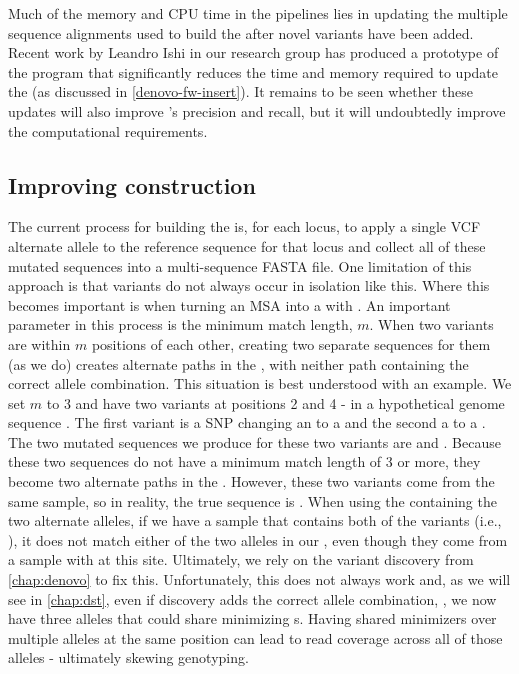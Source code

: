 Much of the memory and CPU time in the \pandora{} pipelines lies in updating the multiple sequence alignments used to build the \panrg{} after novel variants have been added. Recent work by Leandro Ishi in our research group has produced a prototype of the \makeprg{} program that significantly reduces the time and memory required to update the \panrg{} (as discussed in \autoref{denovo-fw-insert}). It remains to be seen whether these updates will also improve \pandora{}'s precision and recall, but it will undoubtedly improve the computational requirements. 

\subsection{Improving \panrg{} construction}
\label{sec:improve-prg}
The current process for building the \mtb{} \panrg{} is, for each locus, to apply a single VCF alternate allele to the reference sequence for that locus and collect all of these mutated sequences into a multi-sequence FASTA file. One limitation of this approach is that variants do not always occur in isolation like this. Where this becomes important is when turning an MSA into a \prg{} with \makeprg{}. An important parameter in this process is the minimum match length, $m$. When two variants are within $m$ positions of each other, creating two separate sequences for them (as we do) creates alternate paths in the \prg{}, with neither path containing the correct allele combination. This situation is best understood with an example. We set $m$ to 3 and have two variants at positions 2 and 4 - in a hypothetical genome sequence . The first variant is a SNP changing an  to a  and the second a  to a . The two mutated sequences we produce for these two variants are  and . Because these two sequences do not have a minimum match length of 3 or more, they become two alternate paths in the \prg{}. However, these two variants come from the same sample, so in reality, the true sequence is . When using the \prg{} containing the two alternate alleles, if we have a sample that contains both of the variants (i.e., ), it does not match either of the two alleles in our \prg{}, even though they come from a sample with  at this site. Ultimately, we rely on the \denovo{} variant discovery from \autoref{chap:denovo} to fix this. Unfortunately, this does not always work and, as we will see in \autoref{chap:dst}, even if \denovo{} discovery adds the correct allele combination, , we now have three alleles that could share minimizing \kmer{}s. Having shared minimizers over multiple alleles at the same position can lead to read coverage across all of those alleles - ultimately skewing genotyping. 

